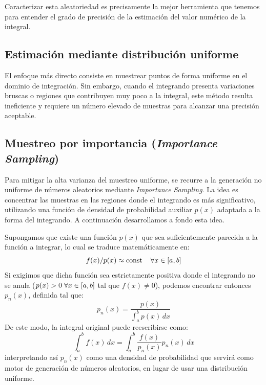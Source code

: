 \documentclass[11pt, a4paper]{article}
\begin{document}
Caracterizar esta aleatoriedad es precisamente la mejor herramienta que tenemos para entender el grado de precisión de la estimación del valor numérico de la integral.

\subsection{Estimación mediante distribución uniforme}
El enfoque más directo consiste en muestrear puntos de forma uniforme en el dominio de integración. Sin embargo, cuando el integrando presenta variaciones bruscas o regiones que contribuyen muy poco a la integral, este método resulta ineficiente y requiere un número elevado de muestras para alcanzar una precisión aceptable.

\subsection{Muestreo por importancia (\textit{Importance Sampling})}
Para mitigar la alta varianza del muestreo uniforme, se recurre a la generación no uniforme de números aleatorios mediante \textit{Importance Sampling}. La idea es concentrar las muestras en las regiones donde el integrando es más significativo, utilizando una función de densidad de probabilidad auxiliar $p(x)$ adaptada a la forma del integrando. A continuación desarrollamos a fondo esta idea.

Supongamos que existe una función $p(x)$ que sea suficientemente parecida a la función a integrar, lo cual se traduce matemáticamente en:
\begin{equation}
 f(x) / p(x) \approx \text{const} \hspace{4mm} \forall x \in [a,b]
\end{equation}
Si exigimos que dicha función sea estrictamente positiva donde el integrando no se anula ($p(x)>0 \hspace{1mm} \forall x \in [a,b]$ tal que $f(x) \neq 0$), podemos encontrar entonces $p_{n}(x)$, definida tal que:
\begin{equation}
 p_n(x) = \frac{p(x)}{\int_a^b p(x)\,dx}
\end{equation}
De este modo, la integral original puede reescribirse como:
\begin{equation}
 \int_a^b f(x)\,dx = \int_a^b \frac{f(x)}{p_n(x)} p_n(x)\,dx
\end{equation}
interpretando así $p_n(x)$ como una densidad de probabilidad que servirá como motor de generación de números aleatorios, en lugar de usar una distribución uniforme.
\end{document}
